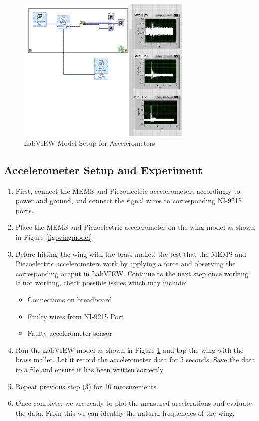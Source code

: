 \documentclass{article}
\begin{document}
\begin{figure}[H]
    \centering
    \includegraphics[width = 0.75\textwidth]{lab6images/blockdiagramlab6.PNG}
    \caption{LabVIEW Model Setup for Accelerometers}
    \label{fig:labview}
\end{figure}

\subsection{Accelerometer Setup and Experiment}
\begin{enumerate}
    \item  First, connect the MEMS and Piezoelectric accelerometers accordingly to power and ground, and connect the signal wires to corresponding NI-9215 ports. 
    \item Place the MEMS and Piezoelectric accelerometer on the wing model as shown in Figure \ref{fig:wingmodel}.
    \item Before hitting the wing with the brass mallet, the test that the MEMS and Piezoelectric accelerometers work by applying a force and observing the corresponding output in LabVIEW. Continue to the next step once working. If not working, check possible issues which may include:
    \begin{itemize}
        \item Connections on breadboard
        \item Faulty wires from NI-9215 Port
        \item Faulty accelerometer sensor
    \end{itemize}
    \item Run the LabVIEW model as shown in Figure \ref{fig:labview} and tap the wing with the brass mallet. Let it record the accelerometer data for 5 seconds. Save the data to a file and ensure it has been written correctly.
    \item Repeat previous step (3) for 10 measurements. 
    \item Once complete, we are ready to plot the measured accelerations and evaluate the data. From this we can identify the natural frequencies of the wing.
\end{enumerate}
\end{document}
